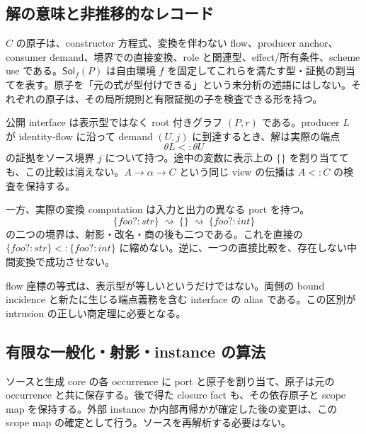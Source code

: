 \documentclass[11pt,a4paper]{article}
\theoremstyle{remark}
\newcommand{\Sol}{\mathsf{Sol}}
\newcommand{\adap}{\rightsquigarrow}
\begin{document}
\subsection{解の意味と非推移的なレコード}

$C$ の原子は、constructor 方程式、変換を伴わない flow、producer anchor、consumer demand、境界での直接変換、role と関連型、effect/所有条件、scheme use である。$\Sol_f(P)$ は自由環境 $f$ を固定してこれらを満たす型・証拠の割当てを表す。原子を「元の式が型付けできる」という未分析の述語にはしない。それぞれの原子は、その局所規則と有限証拠の子を検査できる形を持つ。

公開 interface は表示型ではなく root 付きグラフ $(P,r)$ である。producer $L$ が identity-flow に沿って demand $(U,j)$ に到達するとき、解は実際の端点
\[
             \theta L<:\theta U
\]
の証拠をソース境界 $j$ について持つ。途中の変数に表示上の $\{\}$ を割り当てても、この比較は消えない。$A\to\alpha\to C$ という同じ view の伝播は $A<:C$ の検査を保持する。

一方、実際の変換 computation は入力と出力の異なる port を持つ。
\[
 \{foo?:str\}\ \adap\ \{\}\ \adap\ \{foo?:int\}
\]
の二つの境界は、射影・改名・商の後も二つである。これを直接の $\{foo?:str\}<:\{foo?:int\}$ に縮めない。逆に、一つの直接比較を、存在しない中間変換で成功させない。

flow 座標の等式は、表示型が等しいというだけではない。両側の bound incidence と新たに生じる端点義務を含む interface の alias である。この区別が intrusion の正しい商定理に必要となる。

\subsection{有限な一般化・射影・instance の算法}

ソースと生成 core の各 occurrence に port と原子を割り当て、原子は元の occurrence と共に保存する。後で得た closure fact も、その依存原子と scope map を保持する。外部 instance か内部再帰かが確定した後の変更は、この scope map の確定として行う。ソースを再解析する必要はない。
\end{document}
